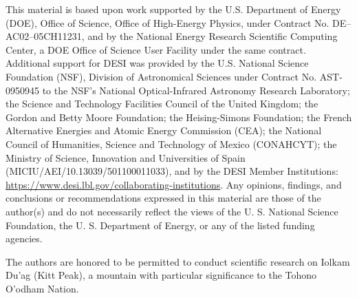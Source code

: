 This material is based upon work supported by the U.S. Department of Energy (DOE), Office of Science, Office of High-Energy Physics, under Contract No. DE–AC02–05CH11231, and by the National Energy Research Scientific Computing Center, a DOE Office of Science User Facility under the same contract. Additional support for DESI was provided by the U.S. National Science Foundation (NSF), Division of Astronomical Sciences under Contract No. AST-0950945 to the NSF’s National Optical-Infrared Astronomy Research Laboratory; the Science and Technology Facilities Council of the United Kingdom; the Gordon and Betty Moore Foundation; the Heising-Simons Foundation; the French Alternative Energies and Atomic Energy Commission (CEA); the National Council of Humanities, Science and Technology of Mexico (CONAHCYT); the Ministry of Science, Innovation and Universities of Spain (MICIU/AEI/10.13039/501100011033), and by the DESI Member Institutions: \url{https://www.desi.lbl.gov/collaborating-institutions}. Any opinions, findings, and conclusions or recommendations expressed in this material are those of the author(s) and do not necessarily reflect the views of the U. S. National Science Foundation, the U. S. Department of Energy, or any of the listed funding agencies.

The authors are honored to be permitted to conduct scientific research on Iolkam Du’ag (Kitt Peak), a mountain with particular significance to the Tohono O’odham Nation.